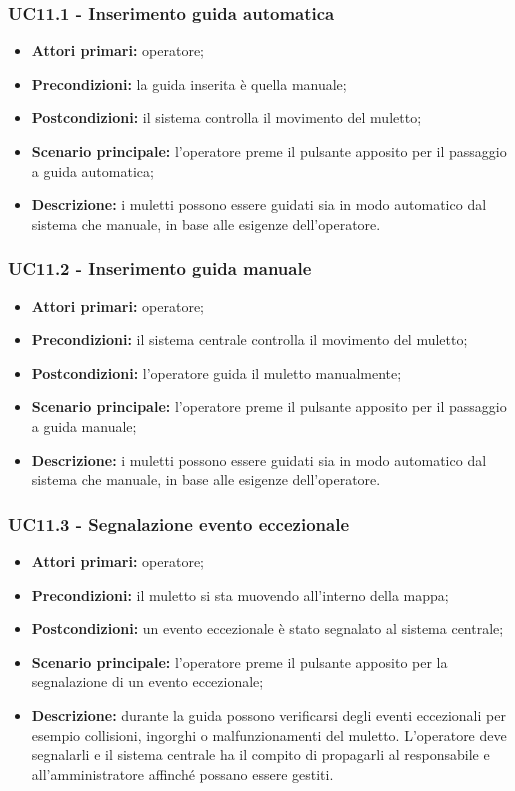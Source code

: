 \subsubsection{UC11.1 - Inserimento guida automatica}
\begin{itemize}
	\item 	\textbf{Attori primari:} operatore;
	\item 	\textbf{Precondizioni:} la guida inserita è quella manuale;
	\item 	\textbf{Postcondizioni:} il sistema controlla il movimento del muletto;
	\item 	\textbf{Scenario principale:} l'operatore preme il pulsante apposito per il passaggio a guida automatica;
	\item 	\textbf{Descrizione:} i muletti possono essere guidati sia in modo automatico dal sistema che manuale, in base alle esigenze dell'operatore.
\end{itemize}

\subsubsection{UC11.2 - Inserimento guida manuale}
\begin{itemize}
	\item 	\textbf{Attori primari:} operatore;
	\item 	\textbf{Precondizioni:} il sistema centrale controlla il movimento del muletto;
	\item 	\textbf{Postcondizioni:} l'operatore guida il muletto manualmente; 
	\item 	\textbf{Scenario principale:} l'operatore preme il pulsante apposito per il passaggio a guida manuale;
	\item 	\textbf{Descrizione:} i muletti possono essere guidati sia in modo automatico dal sistema che manuale, in base alle esigenze dell'operatore.
\end{itemize}

\subsubsection{UC11.3 - Segnalazione evento eccezionale}
\begin{itemize}
	\item 	\textbf{Attori primari:} operatore;
	\item 	\textbf{Precondizioni:} il muletto si sta muovendo all'interno della mappa;
	\item 	\textbf{Postcondizioni:} un evento eccezionale è stato segnalato al sistema centrale; 
	\item 	\textbf{Scenario principale:} l'operatore preme il pulsante apposito per la segnalazione di un evento eccezionale;
	\item 	\textbf{Descrizione:} durante la guida possono verificarsi degli eventi eccezionali per esempio collisioni, ingorghi o malfunzionamenti del muletto. L'operatore deve segnalarli e il sistema centrale ha il compito di propagarli al responsabile e all'amministratore affinché possano essere gestiti.

\end{itemize}


